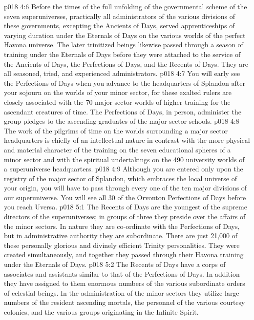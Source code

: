 \vs p018 4:6 Before the times of the full unfolding of the governmental scheme of the seven superuniverses, practically all administrators of the various divisions of these governments, excepting the Ancients of Days, served apprenticeships of varying duration under the Eternals of Days on the various worlds of the perfect Havona universe. The later trinitized beings likewise passed through a season of training under the Eternals of Days before they were attached to the service of the Ancients of Days, the Perfections of Days, and the Recents of Days. They are all seasoned, tried, and experienced administrators.
\vs p018 4:7 \pc You will early see the Perfections of Days when you advance to the headquarters of Splandon after your sojourn on the worlds of your minor sector, for these exalted rulers are closely associated with the 70 major sector worlds of higher training for the ascendant creatures of time. The Perfections of Days, in person, administer the group pledges to the ascending graduates of the major sector schools.
\vs p018 4:8 The work of the pilgrims of time on the worlds surrounding a major sector headquarters is chiefly of an intellectual nature in contrast with the more physical and material character of the training on the seven educational spheres of a minor sector and with the spiritual undertakings on the 490 university worlds of a superuniverse headquarters.
\vs p018 4:9 Although you are entered only upon the registry of the major sector of Splandon, which embraces the local universe of your origin, you will have to pass through every one of the ten major divisions of our superuniverse. You will see all 30 of the Orvonton Perfections of Days before you reach Uversa.
\vs p018 5:1 The Recents of Days are the youngest of the supreme directors of the superuniverses; in groups of three they preside over the affairs of the minor sectors. In nature they are co\hyp{}ordinate with the Perfections of Days, but in administrative authority they are subordinate. There are just 21,000 of these personally glorious and divinely efficient Trinity personalities. They were created simultaneously, and together they passed through their Havona training under the Eternals of Days.
\vs p018 5:2 The Recents of Days have a corps of associates and assistants similar to that of the Perfections of Days. In addition they have assigned to them enormous numbers of the various subordinate orders of celestial beings. In the administration of the minor sectors they utilize large numbers of the resident ascending mortals, the personnel of the various courtesy colonies, and the various groups originating in the Infinite Spirit.

